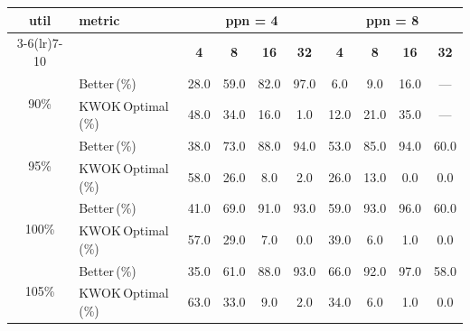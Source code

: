 \begin{tabular}{@{}c l *{8}{c}@{}}
\toprule
\multirow{2}{*}{\textbf{util}} & \multirow{2}{*}{\textbf{metric}} &\multicolumn{4}{c}{\textbf{ppn = 4}} & \multicolumn{4}{c}{\textbf{ppn = 8}}\\
\cmidrule(lr){3-6}\cmidrule(lr){7-10}
 &  & \textbf{4} & \textbf{8} & \textbf{16} & \textbf{32} & \textbf{4} & \textbf{8} & \textbf{16} & \textbf{32}\\
\midrule
\multirow{2}{*}{90\%}
& Better\,(\%) & 28.0 & 59.0 & 82.0 & 97.0 & 6.0 & 9.0 & 16.0 & \multicolumn{1}{c}{—} \\
& KWOK\,Optimal\,(\%) & 48.0 & 34.0 & 16.0 & 1.0 & 12.0 & 21.0 & 35.0 & \multicolumn{1}{c}{—} \\
\midrule
\multirow{2}{*}{95\%}
& Better\,(\%) & 38.0 & 73.0 & 88.0 & 94.0 & 53.0 & 85.0 & 94.0 & 60.0 \\
& KWOK\,Optimal\,(\%) & 58.0 & 26.0 & 8.0 & 2.0 & 26.0 & 13.0 & 0.0 & 0.0 \\
\midrule
\multirow{2}{*}{100\%}
& Better\,(\%) & 41.0 & 69.0 & 91.0 & 93.0 & 59.0 & 93.0 & 96.0 & 60.0 \\
& KWOK\,Optimal\,(\%) & 57.0 & 29.0 & 7.0 & 0.0 & 39.0 & 6.0 & 1.0 & 0.0 \\
\midrule
\multirow{2}{*}{105\%}
& Better\,(\%) & 35.0 & 61.0 & 88.0 & 93.0 & 66.0 & 92.0 & 97.0 & 58.0 \\
& KWOK\,Optimal\,(\%) & 63.0 & 33.0 & 9.0 & 2.0 & 34.0 & 6.0 & 1.0 & 0.0 \\
\bottomrule
\end{tabular}
